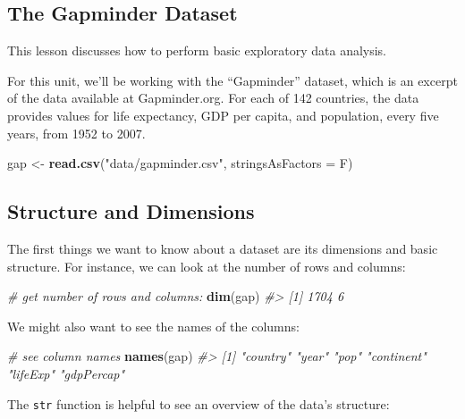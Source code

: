 \documentclass[]{book}
\newenvironment{Shaded}{\begin{snugshade}}{\end{snugshade}}
\newcommand{\KeywordTok}[1]{\textcolor[rgb]{0.13,0.29,0.53}{\textbf{#1}}}
\newcommand{\DataTypeTok}[1]{\textcolor[rgb]{0.13,0.29,0.53}{#1}}
\newcommand{\StringTok}[1]{\textcolor[rgb]{0.31,0.60,0.02}{#1}}
\newcommand{\CommentTok}[1]{\textcolor[rgb]{0.56,0.35,0.01}{\textit{#1}}}
\newcommand{\NormalTok}[1]{#1}
\begin{document}
\subsection{The Gapminder Dataset}\label{the-gapminder-dataset}

This lesson discusses how to perform basic exploratory data analysis.

For this unit, we'll be working with the ``Gapminder'' dataset, which is
an excerpt of the data available at Gapminder.org. For each of 142
countries, the data provides values for life expectancy, GDP per capita,
and population, every five years, from 1952 to 2007.

\begin{Shaded}
\begin{Highlighting}[]
\NormalTok{gap <-}\StringTok{ }\KeywordTok{read.csv}\NormalTok{(}\StringTok{"data/gapminder.csv"}\NormalTok{, }\DataTypeTok{stringsAsFactors =}\NormalTok{ F)}
\end{Highlighting}
\end{Shaded}

\subsection{Structure and Dimensions}\label{structure-and-dimensions}

The first things we want to know about a dataset are its dimensions and
basic structure. For instance, we can look at the number of rows and
columns:

\begin{Shaded}
\begin{Highlighting}[]
\CommentTok{# get number of rows and columns:}
\KeywordTok{dim}\NormalTok{(gap)}
\CommentTok{#> [1] 1704    6}
\end{Highlighting}
\end{Shaded}

We might also want to see the names of the columns:

\begin{Shaded}
\begin{Highlighting}[]
\CommentTok{# see column names}
\KeywordTok{names}\NormalTok{(gap)}
\CommentTok{#> [1] "country"   "year"      "pop"       "continent" "lifeExp"   "gdpPercap"}
\end{Highlighting}
\end{Shaded}

The \texttt{str} function is helpful to see an overview of the data's
structure:
\end{document}
